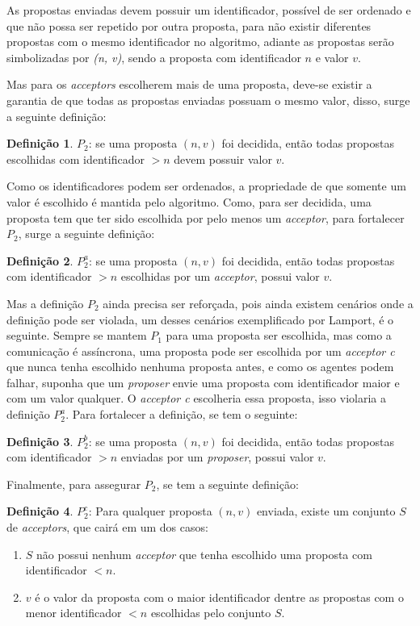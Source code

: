 \documentclass[12pt,
openright, 
oneside,
a4paper,
brazil]{facom-ufu-abntex2}
\theoremstyle{definition}
\newtheorem*{definition}{Definição}
\begin{document}
As propostas enviadas devem possuir um identificador, possível de ser ordenado e que não 
possa ser repetido por outra proposta, para não existir diferentes propostas com o mesmo
identificador no algoritmo, adiante as propostas serão simbolizadas por 
\textit{(n, v)}, sendo a proposta com identificador $n$ e valor $v$.

Mas para os \textit{acceptors} escolherem mais de uma proposta, deve-se existir a garantia de
que todas as propostas enviadas possuam o mesmo valor, disso, surge a seguinte definição:

\begin{definition}
$P_2$: se uma proposta $(n, v)$ foi decidida, então todas propostas escolhidas com 
identificador $>n$ devem possuir valor $v$.
\end{definition}

Como os identificadores podem ser ordenados, a propriedade de que somente um valor é escolhido
é mantida pelo algoritmo. Como, para ser decidida, uma proposta tem que ter sido escolhida
por pelo menos um \textit{acceptor}, para fortalecer $P_2$, surge a seguinte definição:

\begin{definition}
$P_2^a$: se uma proposta $(n, v)$ foi decidida, então todas propostas com identificador
$>n$ escolhidas por um \textit{acceptor}, possui valor $v$.
\end{definition}

Mas a definição $P_2$ ainda precisa ser reforçada, pois ainda existem cenários onde a 
definição pode ser violada, um desses cenários exemplificado por Lamport, é o seguinte. 
Sempre se mantem $P_1$ para uma proposta ser escolhida, mas como
a comunicação é assíncrona, uma proposta pode ser escolhida por um \textit{acceptor c} 
que nunca tenha escolhido nenhuma proposta antes, e como os agentes podem falhar, suponha
que um \textit{proposer} envie uma proposta com identificador maior e com um valor qualquer.
O \textit{acceptor c} escolheria essa proposta, isso violaria a definição $P_2^a$. Para
fortalecer a definição, se tem o seguinte:

\begin{definition}
$P_2^b$: se uma proposta $(n, v)$ foi decidida, então todas propostas com identificador
$>n$ enviadas por um \textit{proposer}, possui valor $v$.
\end{definition}

Finalmente, para assegurar $P_2$, se tem a seguinte definição:

\begin{definition}
$P_2^c$: Para qualquer proposta $(n, v)$ enviada, existe um conjunto $S$ de
\textit{acceptors}, que cairá em um dos casos:

\begin{enumerate}
    \item $S$ não possui nenhum \textit{acceptor} que tenha escolhido uma proposta com 
identificador $<n$.

    \item $v$ é o valor da proposta com o maior identificador dentre as propostas com o 
menor identificador $<n$ escolhidas pelo conjunto $S$.
\end{enumerate}
\end{definition}
\end{document}
